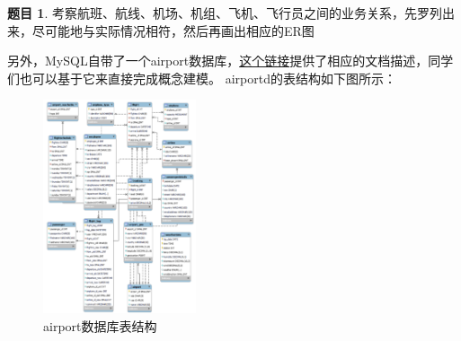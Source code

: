 \documentclass[12pt]{article} %
\theoremstyle{definition}
\newtheorem{problem}{题目}
\begin{document}
\begin{problem}
考察航班、航线、机场、机组、飞机、飞行员之间的业务关系，先罗列出来，尽可能地与实际情况相符，然后再画出相应的ER图

另外，MySQL自带了一个airport数据库，\href{https://downloads.mysql.com/docs/airportdb-en.a4.pdf}{这个链接}提供了相应的文档描述，同学们也可以基于它来直接完成概念建模。
airportd的表结构如下图所示：
\begin{figure}[H]
  \centering
  \includegraphics[width=0.4\textwidth]{./figs/6.png}
  \caption{airport数据库表结构}
\end{figure}
\end{problem}
\end{document}
